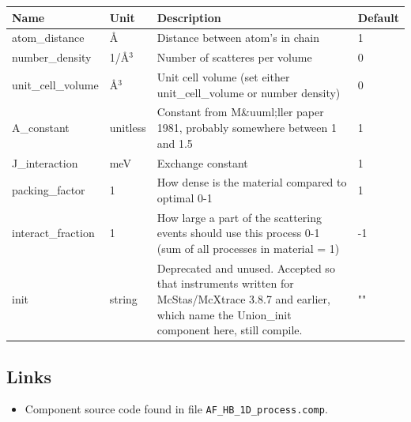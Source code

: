 \begin{longtable}{p{}p{}p{}p{}}
\toprule
\textbf{Name} & \textbf{Unit} & \textbf{Description} & \textbf{Default} \\
\midrule
\endhead
atom\_distance & \AA{} & Distance between atom's in chain & 1 \\
number\_density & 1/\AA{}$^{3}$ & Number of scatteres per volume & 0 \\
unit\_cell\_volume & \AA{}$^{3}$ & Unit cell volume (set either unit\_cell\_volume or number density) & 0 \\
A\_constant & unitless & Constant from M\&uuml;ller paper 1981, probably somewhere between 1 and 1.5 & 1 \\
J\_interaction & meV & Exchange constant & 1 \\
packing\_factor & 1 & How dense is the material compared to optimal 0-1 & 1 \\
interact\_fraction & 1 & How large a part of the scattering events should use this process 0-1 (sum of all processes in material = 1) & -1 \\
init & string & Deprecated and unused. Accepted so that instruments written for McStas/McXtrace 3.8.7 and earlier, which name the Union\_init component here, still compile. & "" \\
\bottomrule
\end{longtable}

\subsection*{Links}
\begin{itemize}
  \item Component source code found in file \texttt{AF\_HB\_1D\_process.comp}.
\end{itemize}
